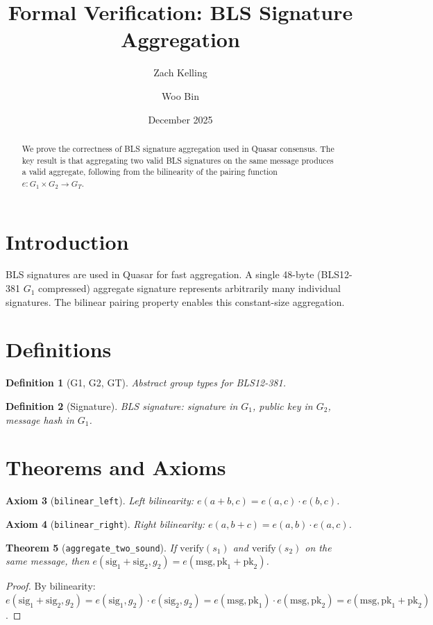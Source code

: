 \documentclass[11pt]{article}
\title{Formal Verification: BLS Signature Aggregation}
\author{Zach Kelling \and Woo Bin}
\date{December 2025}
\newtheorem{theorem}{Theorem}
\newtheorem{definition}[theorem]{Definition}
\newtheorem{axiom_stmt}[theorem]{Axiom}
\begin{document}
\maketitle

\begin{abstract}
We prove the correctness of BLS signature aggregation used in Quasar consensus. The key result is that aggregating two valid BLS signatures on the same message produces a valid aggregate, following from the bilinearity of the pairing function $e: G_1 \times G_2 \to G_T$.
\end{abstract}

\section{Introduction}
BLS signatures are used in Quasar for fast aggregation. A single 48-byte (BLS12-381 $G_1$ compressed) aggregate signature represents arbitrarily many individual signatures. The bilinear pairing property enables this constant-size aggregation.

\section{Definitions}
\begin{definition}[G1, G2, GT]
Abstract group types for BLS12-381.
\end{definition}

\begin{definition}[Signature]
BLS signature: signature in $G_1$, public key in $G_2$, message hash in $G_1$.
\end{definition}


\section{Theorems and Axioms}
\begin{axiom_stmt}[\texttt{bilinear\_left}]
Left bilinearity: $e(a+b, c) = e(a,c) \cdot e(b,c)$.
\end{axiom_stmt}

\begin{axiom_stmt}[\texttt{bilinear\_right}]
Right bilinearity: $e(a, b+c) = e(a,b) \cdot e(a,c)$.
\end{axiom_stmt}

\begin{theorem}[\texttt{aggregate\_two\_sound}]
If $\text{verify}(s_1)$ and $\text{verify}(s_2)$ on the same message, then $e(\text{sig}_1 + \text{sig}_2, g_2) = e(\text{msg}, \text{pk}_1 + \text{pk}_2)$.
\end{theorem}
\begin{proof}
By bilinearity: $e(\text{sig}_1+\text{sig}_2, g_2) = e(\text{sig}_1,g_2) \cdot e(\text{sig}_2,g_2) = e(\text{msg},\text{pk}_1) \cdot e(\text{msg},\text{pk}_2) = e(\text{msg}, \text{pk}_1+\text{pk}_2)$.
\end{proof}
\end{document}

